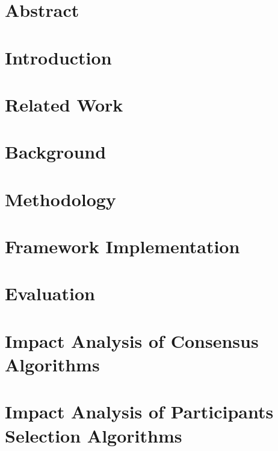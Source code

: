 \documentclass[12pt,a4paper,oneside]{book}
\begin{document}



\chapter*{Abstract}\label{chapter:abstract}


\tableofcontents

\listoffigures

\listoftables

\chapter{Introduction}\label{chapter:introduction}


\chapter{Related Work}\label{chapter:related_work}


\chapter{Background}\label{chapter:background}


\chapter{Methodology}\label{chapter:methodology}


\chapter{Framework Implementation}\label{chapter:implementation}


\chapter{Evaluation}\label{chapter:evaluation}


\chapter{Impact Analysis of Consensus Algorithms}\label{chapter:analysis:consensus_algorithms}


\chapter{Impact Analysis of Participants Selection Algorithms}\label{chapter:analysis:participants}

\end{document}
